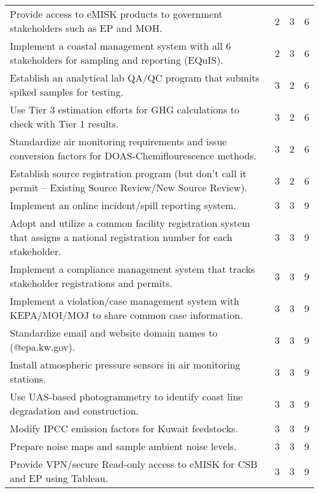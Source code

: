 \begin{table}[H]
{\begin{tabular}{@{}lccc@{}}
Provide access to eMISK products to government stakeholders such as EP and MOH. & 2 & 3 & 6 \\
Implement a coastal management system with all 6 stakeholders for sampling and reporting (EQuIS). & 2 & 3 & 6 \\
Establish an analytical lab QA/QC program that submits spiked samples for testing. & 3 & 2 & 6 \\
Use Tier 3 estimation efforts for GHG calculations to check with Tier 1 results. & 3 & 2 & 6 \\
Standardize air monitoring requirements and issue conversion factors for DOAS-Chemiflourescence methods. & 3 & 2 & 6 \\
Establish source registration program (but don’t call it permit – Existing Source Review/New Source Review). & 3 & 2 & 6 \\
Implement an online incident/spill reporting system. & 3 & 3 & 9 \\
Adopt and utilize a common facility registration system that assigns a national registration number for each stakeholder. & 3 & 3 & 9 \\
Implement a compliance management system that tracks stakeholder registrations and permits. & 3 & 3 & 9 \\
Implement a violation/case management system with KEPA/MOI/MOJ to share common case information. & 3 & 3 & 9 \\
Standardize email and website domain names to (@epa.kw.gov). & 3 & 3 & 9 \\
Install atmospheric pressure sensors in air monitoring stations. & 3 & 3 & 9 \\
Use UAS-based photogrammetry to identify coast line degradation and construction. & 3 & 3 & 9 \\
Modify IPCC emission factors for Kuwait feedstocks. & 3 & 3 & 9 \\
Prepare noise maps and sample ambient noise levels. & 3 & 3 & 9 \\
Provide VPN/secure Read-only access to eMISK for CSB and EP using Tableau. & 3 & 3 & 9 \\ \bottomrule
\end{tabular}
} %
\end{table}
